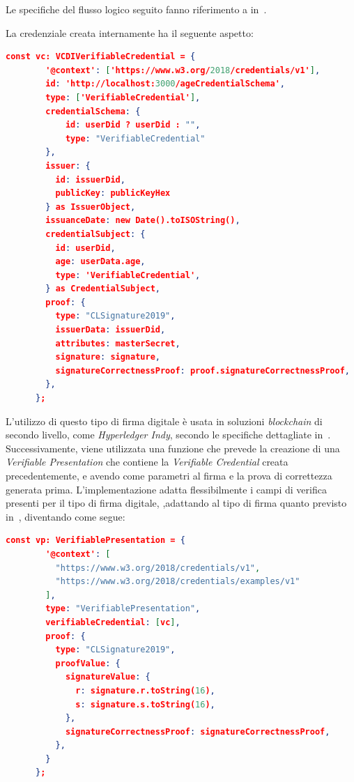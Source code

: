 Le specifiche del flusso logico seguito fanno riferimento a in~\cite{site:clsignature2}.

La credenziale creata internamente ha il seguente aspetto:
\begin{lstlisting}[language=json]
    const vc: VCDIVerifiableCredential = {
        '@context': ['https://www.w3.org/2018/credentials/v1'],
        id: 'http://localhost:3000/ageCredentialSchema',
        type: ['VerifiableCredential'],
        credentialSchema: { 
            id: userDid ? userDid : "",
            type: "VerifiableCredential"
        },        
        issuer: {
          id: issuerDid,
          publicKey: publicKeyHex 
        } as IssuerObject,
        issuanceDate: new Date().toISOString(),
        credentialSubject: {
          id: userDid,
          age: userData.age,
          type: 'VerifiableCredential',
        } as CredentialSubject,
        proof: {
          type: "CLSignature2019", 
          issuerData: issuerDid, 
          attributes: masterSecret,
          signature: signature,
          signatureCorrectnessProof: proof.signatureCorrectnessProof,
        },
      };
\end{lstlisting}
L'utilizzo di questo tipo di firma digitale è usata in soluzioni \textit{blockchain} di secondo livello, come \textit{Hyperledger Indy}, 
secondo le specifiche dettagliate in~\cite{site:clsignature}. \\

Successivamente, viene utilizzata una funzione che prevede la creazione di una \textit{Verifiable Presentation} che contiene la \textit{Verifiable Credential} creata precedentemente,
e avendo come parametri al firma e la prova di correttezza generata prima. L'implementazione adatta flessibilmente i campi di verifica presenti per il tipo di firma digitale, 
,adattando al tipo di firma quanto previsto in~\cite{site:vpw3c}, diventando come segue:
\begin{lstlisting}[language=json]
    const vp: VerifiablePresentation = {
        '@context': [
          "https://www.w3.org/2018/credentials/v1",
          "https://www.w3.org/2018/credentials/examples/v1"
        ],
        type: "VerifiablePresentation",
        verifiableCredential: [vc],
        proof: {
          type: "CLSignature2019",
          proofValue: {
            signatureValue: {
              r: signature.r.toString(16),
              s: signature.s.toString(16),
            },
            signatureCorrectnessProof: signatureCorrectnessProof,
          },
        }
      };
\end{lstlisting}

